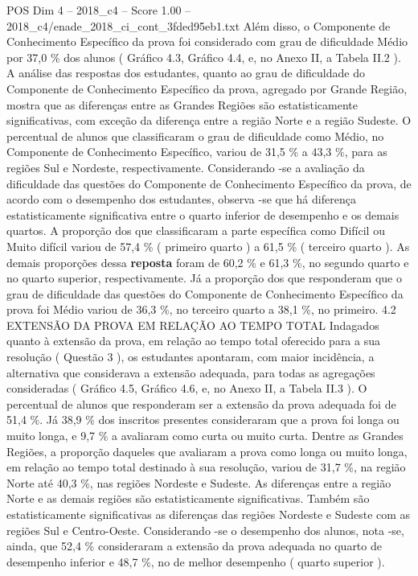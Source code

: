 \begin{textsample}{POS Dim 4 – 2018\_c4 – Score 1.00 – 2018\_c4/enade\_2018\_ci\_cont\_3fded95eb1.txt}
Além disso, o Componente de Conhecimento Específico da prova foi considerado com grau de dificuldade Médio por 37,0 \% dos alunos ( Gráfico 4.3, Gráfico 4.4, e, no Anexo II, a Tabela II.2 ).
A análise das respostas dos estudantes, quanto ao grau de dificuldade do Componente de Conhecimento Específico da prova, agregado por Grande Região, mostra que as diferenças entre as Grandes Regiões são estatisticamente significativas, com exceção da diferença entre a região Norte e a região Sudeste.
O percentual de alunos que classificaram o grau de dificuldade como Médio, no Componente de Conhecimento Específico, variou de 31,5 \% a 43,3 \%, para as regiões Sul e Nordeste, respectivamente.
Considerando -se a avaliação da dificuldade das questões do Componente de Conhecimento Específico da prova, de acordo com o desempenho dos estudantes, observa -se que há diferença estatisticamente significativa entre o quarto inferior de desempenho e os demais quartos.
A proporção dos que classificaram a parte específica como Difícil ou Muito difícil variou de 57,4 \% ( primeiro quarto ) a 61,5 \% ( terceiro quarto ).
As demais proporções dessa \textbf{reposta} foram de 60,2 \% e 61,3 \%, no segundo quarto e no quarto superior, respectivamente.
Já a proporção dos que responderam que o grau de dificuldade das questões do Componente de Conhecimento Específico da prova foi Médio variou de 36,3 \%, no terceiro quarto a 38,1 \%, no primeiro. 4.2 EXTENSÃO DA PROVA EM RELAÇÃO AO TEMPO TOTAL Indagados quanto à extensão da prova, em relação ao tempo total oferecido para a sua resolução ( Questão 3 ), os estudantes apontaram, com maior incidência, a alternativa que considerava a extensão adequada, para todas as agregações consideradas ( Gráfico 4.5, Gráfico 4.6, e, no Anexo II, a Tabela II.3 ).
O percentual de alunos que responderam ser a extensão da prova adequada foi de 51,4 \%.
Já 38,9 \% dos inscritos presentes consideraram que a prova foi longa ou muito longa, e 9,7 \% a avaliaram como curta ou muito curta.
Dentre as Grandes Regiões, a proporção daqueles que avaliaram a prova como longa ou muito longa, em relação ao tempo total destinado à sua resolução, variou de 31,7 \%, na região Norte até 40,3 \%, nas regiões Nordeste e Sudeste.
As diferenças entre a região Norte e as demais regiões são estatisticamente significativas.
Também são estatisticamente significativas as diferenças das regiões Nordeste e Sudeste com as regiões Sul e Centro-Oeste.
Considerando -se o desempenho dos alunos, nota -se, ainda, que 52,4 \% consideraram a extensão da prova adequada no quarto de desempenho inferior e 48,7 \%, no de melhor desempenho ( quarto superior ).

\end{textsample}
